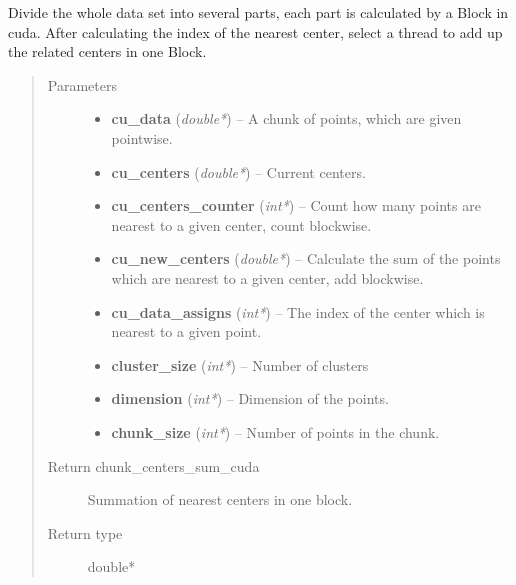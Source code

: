 \documentclass[letterpaper,10pt,english]{sphinxmanual}
\begin{document}
\begin{fulllineitems}
\label{kmeans:c.chunk_centers_sum_cuda}
Divide the whole data set into several parts, each part is calculated by a Block in cuda.
After calculating the index of the nearest center, select a thread to add up the related centers in one Block.
\begin{quote}\begin{description}
\item[{Parameters}] \leavevmode\begin{itemize}
\item {} 
\textbf{cu\_data} (\emph{double*}) -- A chunk of points, which are given pointwise.

\item {} 
\textbf{cu\_centers} (\emph{double*}) -- Current centers.

\item {} 
\textbf{cu\_centers\_counter} (\emph{int*}) -- Count how many points are nearest to a given center, count blockwise.

\item {} 
\textbf{cu\_new\_centers} (\emph{double*}) -- Calculate the sum of the points which are nearest to a given center, add blockwise.

\item {} 
\textbf{cu\_data\_assigns} (\emph{int*}) -- The index of the center which is nearest to a given point.

\item {} 
\textbf{cluster\_size} (\emph{int*}) -- Number of clusters

\item {} 
\textbf{dimension} (\emph{int*}) -- Dimension of the points.

\item {} 
\textbf{chunk\_size} (\emph{int*}) -- Number of points in the chunk.

\end{itemize}

\item[{Return chunk\_centers\_sum\_cuda}] \leavevmode
Summation of nearest centers in one block.

\item[{Return type}] \leavevmode
double*

\end{description}\end{quote}

\end{fulllineitems}
\end{document}
